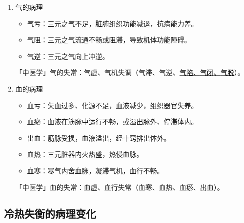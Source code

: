 \documentclass[cn,hazy,black,12pt,normal,founder]{elegantnote}
\newcommand{\redt}[1]{\textcolor{black}{{}#1}}      %
\begin{document}
\begin{enumerate}
  \item 气的病理
  \begin{itemize}
    \item 气亏：三元之气不足，脏腑组织功能减退，抗病能力差。
    \item 气阻：三元之气流通不畅或阻滞，导致机体功能障碍。
    \item 气逆：三元之气向上冲逆。
  \end{itemize}

  \begin{note}
  「中医学」气的失常：气虚、气机失调（气滞、气逆、\uline{\redt{气陷}、\redt{气闭}、\redt{气脱}}）。
  \end{note}

  \item 血的病理
  \begin{itemize}
    \item 血亏：失血过多、化源不足，血液减少，组织器官失养。
    \item 血瘀：血液在筋脉中运行不畅，或溢出脉外、停滞体内。
    \item 出血：筋脉受损，血液溢出，经十窍排出体外。
    \item 血热：三元脏器内火热盛，热侵血脉。
    \item 血寒：寒气内舍血脉，凝滞气机，血行不畅。
  \end{itemize}

  \begin{note}
  「中医学」血的失常：血虚、血行失常（血寒、血热、血瘀、出血）。
  \end{note}
\end{enumerate}

\subsection{冷热失衡的病理变化}
\end{document}
